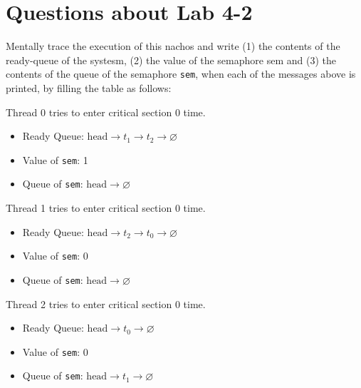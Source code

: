 \documentclass[11pt]{article}
\begin{document}
\section{Questions about Lab 4-2}
\setcounter{qsection}{0}
\begin{question}

    Mentally trace the execution of this nachos and write (1) the contents of the ready-queue of the systesm, (2) the value of the semaphore sem and (3) the contents of the queue of the semaphore {\tt sem}, when each of the messages above is printed, by filling the table as follows:

    \begin{subquestion}
        Thread 0 tries to enter critical section 0 time.

    \begin{itemize}
        \item{
            Ready Queue: $\text{head}\longrightarrow t_{1}\longrightarrow t_{2}\longrightarrow\varnothing$
        } \item{
            Value of {\tt sem}: 1
        } \item{
            Queue of {\tt sem}: $\text{head}\longrightarrow\varnothing$
        }
    \end{itemize}
    \end{subquestion}

    \begin{subquestion}
        Thread 1 tries to enter critical section 0 time.

    \begin{itemize}
        \item{
            Ready Queue: $\text{head}\longrightarrow t_{2}\longrightarrow t_{0}\longrightarrow\varnothing$
        } \item{
            Value of {\tt sem}: 0
        } \item{
            Queue of {\tt sem}: $\text{head}\longrightarrow\varnothing$
        }
    \end{itemize}
    \end{subquestion}

    \begin{subquestion}
        Thread 2 tries to enter critical section 0 time.

    \begin{itemize}
        \item{
            Ready Queue: $\text{head}\longrightarrow t_{0}\longrightarrow\varnothing$
        } \item{
            Value of {\tt sem}: 0
        } \item{
            Queue of {\tt sem}: $\text{head}\longrightarrow t_{1}\longrightarrow\varnothing$
        }
    \end{itemize}
    \end{subquestion}


\end{question}
\end{document}
